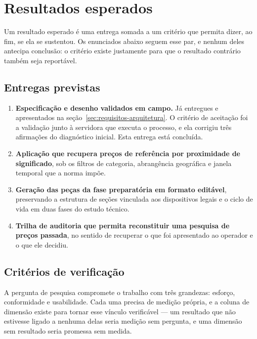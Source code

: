 \section{Resultados esperados}

Um resultado esperado é uma entrega somada a um critério que permita dizer, ao
fim, se ela se sustentou. Os enunciados abaixo seguem esse par, e nenhum deles
antecipa conclusão: o critério existe justamente para que o resultado contrário
também seja reportável.

\subsection{Entregas previstas}

\begin{enumerate}
  \item \textbf{Especificação e desenho validados em campo.} Já entregues e
    apresentados na seção~\ref{sec:requisitos-arquitetura}. O critério de
    aceitação foi a validação junto à servidora que executa o processo, e ela
    corrigiu três afirmações do diagnóstico inicial. Esta entrega está
    concluída.

  \item \textbf{Aplicação que recupera preços de referência por proximidade de
    significado}, sob os filtros de categoria, abrangência geográfica e janela
    temporal que a norma impõe.

  \item \textbf{Geração das peças da fase preparatória em formato editável},
    preservando a estrutura de seções vinculada aos dispositivos legais e o
    ciclo de vida em duas fases do estudo técnico.

  \item \textbf{Trilha de auditoria que permita reconstituir uma pesquisa de
    preços passada}, no sentido de recuperar o que foi apresentado ao operador e
    o que ele decidiu.
\end{enumerate}

\subsection{Critérios de verificação}

A pergunta de pesquisa compromete o trabalho com três grandezas: esforço,
conformidade e usabilidade. Cada uma precisa de medição própria, e a coluna de
dimensão existe para tornar esse vínculo verificável — um resultado que não
estivesse ligado a nenhuma delas seria medição sem pergunta, e uma dimensão sem
resultado seria promessa sem medida.

